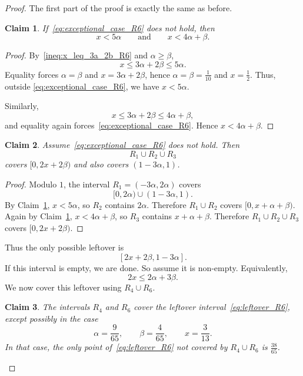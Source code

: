 \documentclass{article}
\newtheorem{claim}{Claim}
\begin{document}
\begin{proof}
The first part of the proof is exactly the same as before.

\begin{claim}\label{claim:strict_first_inequalities_R6}
If~\eqref{eq:exceptional_case_R6} does not hold, then
\[
    x<5\alpha
    \qquad\text{and}\qquad
    x<4\alpha+\beta.
\]
\end{claim}

\begin{proof}
By~\eqref{ineq:x_leq_3a_2b_R6} and $\alpha\geq\beta$,
\[
    x\leq 3\alpha+2\beta\leq 5\alpha.
\]
Equality forces $\alpha=\beta$ and $x=3\alpha+2\beta$, hence
$\alpha=\beta=\frac1{10}$ and $x=\frac12$. Thus, outside
\eqref{eq:exceptional_case_R6}, we have $x<5\alpha$.

Similarly,
\[
    x\leq 3\alpha+2\beta\leq 4\alpha+\beta,
\]
and equality again forces~\eqref{eq:exceptional_case_R6}. Hence $x<4\alpha+\beta$.
\end{proof}

\begin{claim}\label{claim:first_cover_R6}
Assume~\eqref{eq:exceptional_case_R6} does not hold. Then
\[
    R_1\cup R_2\cup R_3
\]
covers $[0,2x+2\beta)$ and also covers $(1-3\alpha,1)$.
\end{claim}

\begin{proof}
Modulo $1$, the interval $R_1=(-3\alpha,2\alpha)$ covers
\[
    [0,2\alpha)\cup(1-3\alpha,1).
\]
By Claim~\ref{claim:strict_first_inequalities_R6}, $x<5\alpha$, so $R_2$ contains
$2\alpha$. Therefore $R_1\cup R_2$ covers $[0,x+\alpha+\beta)$.
Again by Claim~\ref{claim:strict_first_inequalities_R6}, $x<4\alpha+\beta$, so
$R_3$ contains $x+\alpha+\beta$. Therefore $R_1\cup R_2\cup R_3$ covers
$[0,2x+2\beta)$.
\end{proof}

Thus the only possible leftover is
\begin{equation}\label{eq:leftover_R6}
    [2x+2\beta,1-3\alpha].
\end{equation}
If this interval is empty, we are done. So assume it is non-empty. Equivalently,
\begin{equation}\label{ineq:two_x_bound_R6}
    2x\leq 2\alpha+3\beta.
\end{equation}
We now cover this leftover using $R_4\cup R_6$.

\begin{claim}\label{claim:R4_R6_cover_except_fake}
The intervals $R_4$ and $R_6$ cover the leftover interval~\eqref{eq:leftover_R6}, except
possibly in the case
\begin{equation}\label{eq:fake_case_R6}
    \alpha=\frac9{65}, \qquad \beta=\frac4{65}, \qquad x=\frac3{13}.
\end{equation}
In that case, the only point of~\eqref{eq:leftover_R6} not covered by $R_4\cup R_6$ is
$\frac{38}{65}$.
\end{claim}


\end{proof}
\end{document}
